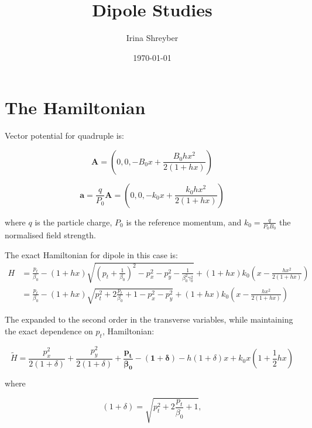 \documentclass[12pt]{article}
\begin{document}
\title{Dipole Studies}
\author{Irina Shreyber}
\date{\ddmmyyyydate\today}

\maketitle

\section{The Hamiltonian}
Vector potential for quadruple is: 

\begin{equation}
\pmb{A} = \left(0, 0, -B_{0}x + \frac{B_{0}hx^{2}}{2(1+hx)} \right)
\end{equation}

\begin{equation}
\pmb{a}= \frac{q}{P_{0}}\pmb{A} = \left(0, 0, -k_{0}x + \frac{k_{0}hx^{2}}{2(1+hx)} \right)
\end{equation}

where $q$ is the particle charge, $P_{0}$ is the reference momentum, and $k_{0} = \frac{q}{P_{0}B_{0}}$ the normalised field strength.

The exact Hamiltonian for dipole in this case is:
\begin{align*}
H & = \frac{p_{t}}{\beta_{0}}-(1+hx)\sqrt {\left(p_{t}+\frac{1}{\beta_{0}} \right)^{2} - p_{x}^{2} - p_{y}^{2} -\frac{1}{\beta_{0}^{2}\gamma_{0}^{2}}} +(1+hx)k_{0}\left(x-\frac{hx^{2}}{2(1+hx)}\right)  \\
&= \frac{p_{t}}{\beta_{0}}-(1+hx)\sqrt {p_{t}^{2}+2\frac{p_{t}}{\beta_{0}} + 1 - p_{x}^{2} - p_{y}^{2} } +(1+hx)k_{0}\left(x-\frac{hx^{2}}{2(1+hx)}\right)
\label{eq: Hamiltonian Dipole}
\end{align*}
 

The expanded to the second order in the transverse variables, while maintaining the exact dependence on  $p_{t}$, Hamiltonian: 

\begin{equation}
\label{eq: Hamiltonian Dipole Taylor Part Exact}
\tilde{H} = \frac{p_{x}^{2}}{2(1+\delta)} + \frac{p_{y}^{2}}{2(1+\delta)} + \pmb{ \frac{p_{t}}{\beta_{0}} - (1+\delta)} - h(1+\delta)x +k_{0}x\left(1+\frac{1}{2}hx\right)
\end{equation}

where 

\begin{equation}
\label{eq: momentum deviation}
(1+\delta) = \sqrt{p_{t}^{2} + 2\frac{p_{t}}{\beta_{0}} + 1},
\end{equation}
\end{document}
